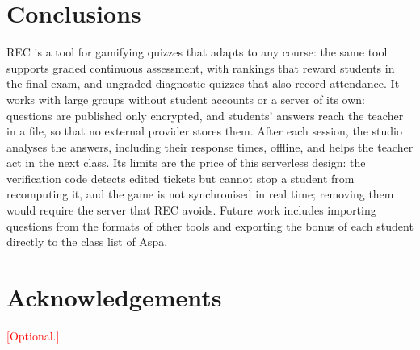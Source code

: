 \documentclass[preprint,12pt, a4paper]{elsarticle}
\newcommand{\todo}[1]{\textcolor{red}{[#1]}}
\begin{document}
\section{Conclusions}
\label{sec:conclusions}

REC is a tool for gamifying quizzes that adapts to any course: the same tool supports graded continuous assessment, with rankings that reward students in the final exam, and ungraded diagnostic quizzes that also record attendance. It works with large groups without student accounts or a server of its own: questions are published only encrypted, and students' answers reach the teacher in a file, so that no external provider stores them. After each session, the studio analyses the answers, including their response times, offline, and helps the teacher act in the next class. Its limits are the price of this serverless design: the verification code detects edited tickets but cannot stop a student from recomputing it, and the game is not synchronised in real time; removing them would require the server that REC avoids. Future work includes importing questions from the formats of other tools and exporting the bonus of each student directly to the class list of Aspa.

\section*{Acknowledgements}
\label{sec:acknowledgements}

\todo{Optional.}
\end{document}
